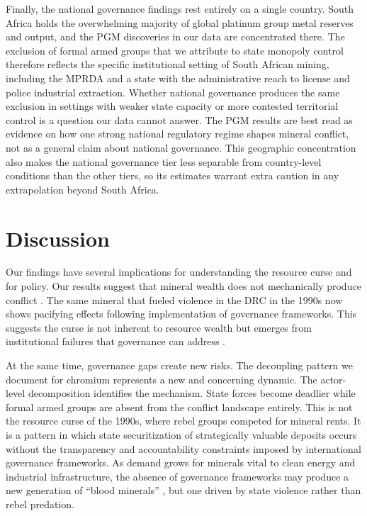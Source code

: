 \documentclass[11pt]{article}
\begin{document}
Finally, the national governance findings rest entirely on a single country. South Africa holds the overwhelming majority of global platinum group metal reserves and output, and the PGM discoveries in our data are concentrated there. The exclusion of formal armed groups that we attribute to state monopoly control therefore reflects the specific institutional setting of South African mining, including the MPRDA and a state with the administrative reach to license and police industrial extraction. Whether national governance produces the same exclusion in settings with weaker state capacity or more contested territorial control is a question our data cannot answer. The PGM results are best read as evidence on how one strong national regulatory regime shapes mineral conflict, not as a general claim about national governance. This geographic concentration also makes the national governance tier less separable from country-level conditions than the other tiers, so its estimates warrant extra caution in any extrapolation beyond South Africa.


\section{Discussion}
\label{sec:discussion}

Our findings have several implications for understanding the resource curse and for policy. Our results suggest that mineral wealth does not mechanically produce conflict \citep{ross2015resource, gilmore2005resource}. The same mineral that fueled violence in the DRC in the 1990s now shows pacifying effects following implementation of governance frameworks. This suggests the curse is not inherent to resource wealth but emerges from institutional failures that governance can address \citep{mehlum2006institutions, robinson2006governance}.

At the same time, governance gaps create new risks. The decoupling pattern we document for chromium represents a new and concerning dynamic. The actor-level decomposition identifies the mechanism. State forces become deadlier while formal armed groups are absent from the conflict landscape entirely. This is not the resource curse of the 1990s, where rebel groups competed for mineral rents. It is a pattern in which state securitization of strategically valuable deposits occurs without the transparency and accountability constraints imposed by international governance frameworks. As demand grows for minerals vital to clean energy and industrial infrastructure, the absence of governance frameworks may produce a new generation of ``blood minerals'' \citep{enough2009conflict}, but one driven by state violence rather than rebel predation.
\end{document}
